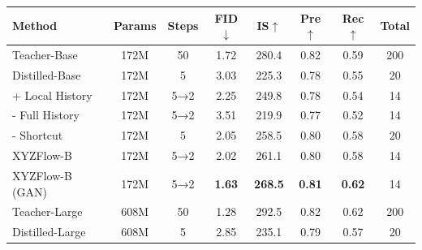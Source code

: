 \documentclass{article}
\theoremstyle{plain}
\theoremstyle{definition}
\theoremstyle{remark}
\begin{document}
\begin{table}[ht]
\centering
\scriptsize
\setlength{\tabcolsep}{1.3pt}
\renewcommand{\arraystretch}{1.1}
\begin{tabular}{@{}lccccccc@{}}
\toprule
\textbf{Method} & \textbf{Params} & \textbf{Steps} & \textbf{FID$\downarrow$} & \textbf{IS$\uparrow$} & \textbf{Pre$\uparrow$} & \textbf{Rec$\uparrow$} & \textbf{Total} \\
\midrule
\rowcolor{gray!10}
Teacher-Base & 172M & 50 & 1.72 & 280.4 & 0.82 & 0.59 & 200 \\
Distilled-Base & 172M & 5 & 3.03 & 225.3 & 0.78 & 0.55 & 20 \\
+ Local History & 172M & 5→2 & 2.25{\color{red}{\tiny$\downarrow$0.78}} & 249.8{\color{red}{\tiny$\uparrow$24.5}} & 0.78 & 0.54{\color{blue}{\tiny$\downarrow$0.01}} & 14 \\
- Full History & 172M & 5→2 & 3.51{\color{blue}{\tiny$\uparrow$0.48}} & 219.9{\color{blue}{\tiny$\downarrow$5.4}} & 0.77{\color{blue}{\tiny$\downarrow$0.01}} & 0.52{\color{blue}{\tiny$\downarrow$0.03}} & 14 \\
- Shortcut & 172M & 5 & 2.05{\color{red}{\tiny$\downarrow$0.98}} & 258.5{\color{red}{\tiny$\uparrow$33.2}} & 0.80{\color{red}{\tiny$\uparrow$0.02}} & 0.58{\color{red}{\tiny$\uparrow$0.03}} & 20 \\
XYZFlow-B & 172M & 5→2 & 2.02{\color{red}{\tiny$\downarrow$1.01}} & 261.1{\color{red}{\tiny$\uparrow$35.8}} & 0.80{\color{red}{\tiny$\uparrow$0.02}} & 0.58{\color{red}{\tiny$\uparrow$0.03}} & 14 \\
\rowcolor{gray!20}
XYZFlow-B (GAN) & 172M & 5→2 & \textbf{1.63{\color{red}{\tiny$\downarrow$1.40}}} & \textbf{268.5{\color{red}{\tiny$\uparrow$43.2}}} & \textbf{0.81{\color{red}{\tiny$\uparrow$0.03}}} & \textbf{0.62{\color{red}{\tiny$\uparrow$0.07}}} & 14 \\
\midrule
\rowcolor{gray!10}
Teacher-Large & 608M & 50 & 1.28 & 292.5 & 0.82 & 0.62 & 200 \\
Distilled-Large & 608M & 5 & 2.85 & 235.1 & 0.79 & 0.57 & 20 \\

\end{tabular}
\end{table}
\end{document}
